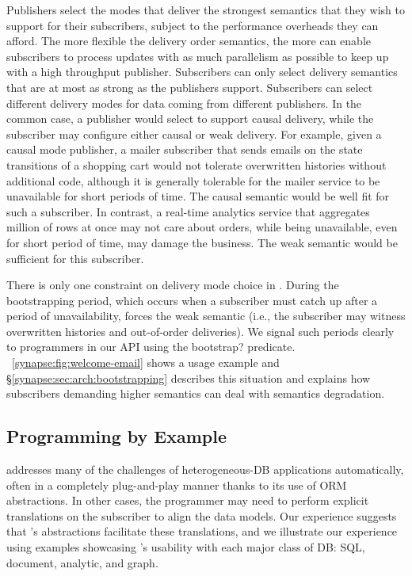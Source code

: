 Publishers select the modes that deliver the strongest semantics that
they wish to support for their subscribers, subject to the performance
overheads they can afford.  The more flexible the delivery order
semantics, the more \synapse can enable subscribers to process updates
with as much parallelism as possible to keep up with a high throughput
publisher.  Subscribers can only select delivery
semantics that are at most as strong as the publishers support.
Subscribers can select different delivery modes for data coming
from different publishers.  In the common case,
a publisher would select to support causal delivery, while the
subscriber may configure either causal or weak delivery. For example,
given a causal mode publisher, a mailer subscriber that sends emails
on the state transitions of a shopping cart would not tolerate
overwritten histories without additional code, although it is
generally tolerable for the mailer service to be unavailable for short
periods of time. The causal semantic would be well fit for
such a subscriber.  In contrast, a real-time analytics service that
aggregates million of rows at once may not care about orders, while
being unavailable, even for short period of time, may damage the
business.  The weak semantic would be sufficient for this subscriber.

There is only one constraint on delivery mode choice in
\synapse.  During the bootstrapping period, which occurs when a
subscriber must catch up after a period of unavailability, \synapse
forces the weak semantic (i.e., the subscriber may witness overwritten
histories and out-of-order deliveries).  We signal such periods
clearly to programmers in our API using the {\code bootstrap?}
predicate. \F~\ref{synapse:fig:welcome-email} shows a usage example and
\S\ref{synapse:sec:arch:bootstrapping} describes this situation and
explains how subscribers demanding higher semantics can deal with semantics
degradation.

\subsection{\synapse Programming by Example}
\label{synapse:sec:examples}

\synapse addresses many of the challenges of heterogeneous-DB applications automatically, often in a completely plug-and-play manner thanks to its use of ORM abstractions.
In other cases, the programmer may need to perform explicit translations on the subscriber to align the data models.
Our experience suggests that \synapse's abstractions facilitate these translations, and we illustrate our experience using examples showcasing \synapse's usability with each major class of DB: SQL, document, analytic, and graph.



